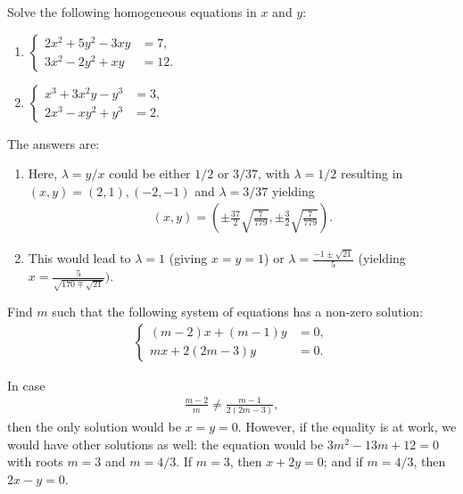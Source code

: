 \documentclass[12pt,a4paper]{memoir}
\theoremstyle{definition}
\begin{document}
\begin{question}
	Solve the following homogeneous equations in $x$ and $y$:
	\begin{enumerate}
		\item $\displaystyle \begin{cases}
			2x^2+5y^2-3xy &= 7,\\3x^2-2y^2+xy &= 12.
		\end{cases}$
		\item $\displaystyle 
			\begin{cases}
				x^3+3x^2y-y^3 &= 3,\\2x^3-xy^2+y^3 &= 2.
			\end{cases}$
	\end{enumerate}
\end{question}

\begin{solution}
	The answers are:
	\begin{enumerate}
		\item Here, $\lambda=y/x$ could be either $1/2$ or $3/37$, with $\lambda=1/2$ resulting in $(x,y)=(2,1), (-2,-1)$ and $\lambda=3/37$ yielding
		\begin{align*}
			(x,y)=\left(\pm\frac{37}{2}\sqrt{\frac{7}{779}},\pm\frac{3}{2}\sqrt{\frac{7}{779}}\right).
		\end{align*}
		\item This would lead to $\lambda=1$ (giving $x=y=1$) or $\lambda=\frac{-1\pm\sqrt{21}}{5}$ (yielding $x=\frac{5}{\sqrt{170\mp\sqrt{21}}})$.
	\end{enumerate}
\end{solution}


\begin{question}
	Find $m$ such that the following system of equations has a non-zero solution:
	\begin{align*}
		\begin{cases}
			(m-2)x+(m-1)y &=0,\\mx+2(2m-3)y &=0.
		\end{cases}
	\end{align*}
\end{question}
\begin{solution}
	In case
	\begin{align*}
		\frac{m-2}{m}\neq\frac{m-1}{2(2m-3)},
	\end{align*}
	then the only solution would be $x=y=0$. However, if the equality is at work, we would have other solutions as well: the equation would be $3m^2-13m+12=0$ with roots $m=3$ and $m=4/3$. If $m=3$, then $x+2y=0$; and if $m=4/3$, then $2x-y=0$.
\end{solution}
\end{document}
